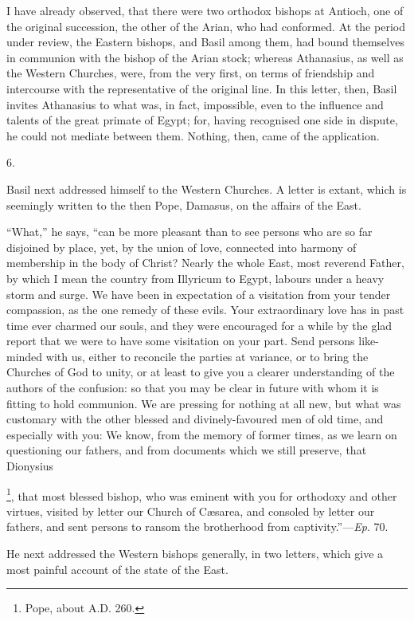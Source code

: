 I have already observed, that there were two orthodox bishops at
Antioch, one of the original succession, the other of the Arian, who
had conformed. At the period under review, the Eastern bishops, and
Basil among them, had bound themselves in communion with the bishop of
the Arian stock; whereas Athanasius, as well as the Western Churches,
were, from the very first, on terms of friendship and intercourse with
the representative of the original line. In this letter, then, Basil
invites Athanasius to what was, in fact, impossible, even to the
influence and talents of the great primate of Egypt; for, having
recognised one side in dispute, he could not mediate between them.
Nothing, then, came of the application.

6.

Basil next addressed himself to the Western Churches. A letter is
extant, which is seemingly written to the then Pope, Damasus, on the
affairs of the East.

``What,'' he says, ``can be more pleasant than to see
persons who are so far disjoined by place, yet, by the union of love,
connected into harmony of membership in the body of Christ? Nearly the
whole East, most reverend Father, by which I mean the country from
Illyricum to Egypt, labours under a heavy storm and surge. We have
been in expectation of a visitation from your tender compassion, as
the one remedy of these evils. Your extraordinary love has in past
time ever charmed our souls, and they were encouraged for a while by
the glad report that we were to have some visitation on your part.
Send persons like-minded with us, either to reconcile the parties at
variance, or to bring the Churches of God to unity, or at least to
give you a clearer understanding of the authors of the confusion: so
that you may be clear in future with whom it is fitting to hold
communion. We are pressing for nothing at all new, but what was
customary with the other blessed and divinely-favoured men of old
time, and especially with you: We know, from the memory of former
times, as we learn on questioning our fathers, and from documents
which we still preserve, that Dionysius

\footnote{Pope, about A.D. 260.}, that most blessed bishop, who was eminent with you for
orthodoxy and other virtues, visited by letter our Church of Cæsarea,
and consoled by letter our fathers, and sent persons to ransom the
brotherhood from captivity.''—\emph{Ep}. 70.

He next addressed the Western bishops generally, in two letters,
which give a most painful account of the state of the East.

